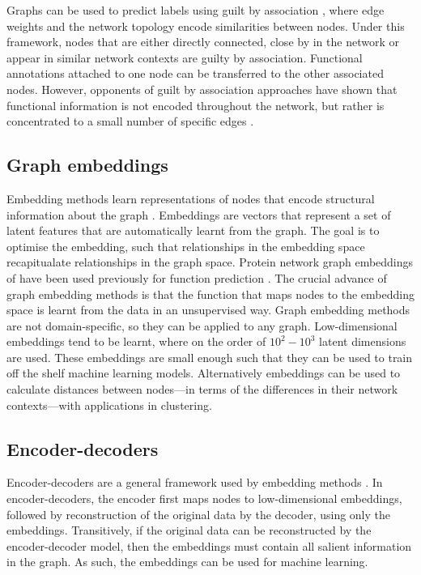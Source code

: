 Graphs can be used to predict labels using guilt by association \cite{Lehtinen2015,Heriche2014,Mostafavi2008,Gligorijevic2018,Cho2016}, where edge weights and the network topology encode similarities between nodes.
Under this framework, nodes that are either directly connected, close by in the network or appear in similar network contexts are guilty by association.
Functional annotations attached to one node can be transferred to the other associated nodes.
However, opponents of guilt by association approaches have shown that functional information is not encoded throughout the network, but rather is concentrated to a small number of specific edges \cite{Gillis2012}.

\subsection{Graph embeddings}

Embedding methods learn representations of nodes that encode structural information about the graph \cite{Hamilton2017}.
Embeddings are vectors that represent a set of latent features that are automatically learnt from the graph.
The goal is to optimise the embedding, such that relationships in the embedding space recapitualate relationships in the graph space.
Protein network graph embeddings of have been used previously for function prediction \cite{Cho2016,Gligorijevic2018}.
The crucial advance of graph embedding methods is that the function that maps nodes to the embedding space is learnt from the data in an unsupervised way.
Graph embedding methods are not domain-specific, so they can be applied to any graph.
Low-dimensional embeddings tend to be learnt, where on the order of $10^2-10^3$ latent dimensions are used.
These embeddings are small enough such that they can be used to train off the shelf machine learning models.
Alternatively embeddings can be used to calculate distances between nodes---in terms of the differences in their network contexts---with applications in clustering.

\subsection{Encoder-decoders}

Encoder-decoders are a general framework used by embedding methods \cite{Hamilton2017}.
In encoder-decoders, the encoder first maps nodes to low-dimensional embeddings, followed by reconstruction of the original data by the decoder, using only the embeddings.
Transitively, if the original data can be reconstructed by the encoder-decoder model, then the embeddings must contain all salient information in the graph.
As such, the embeddings can be used for machine learning.

